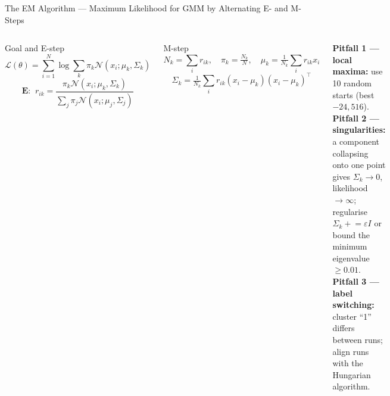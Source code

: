 \documentclass[aspectratio=169,10pt,t]{beamer}
\begin{document}
\begin{frame}{The EM Algorithm --- Maximum Likelihood for GMM by Alternating E- and M-Steps}
\begin{columns}[T]
\begin{fbx}{Goal and E-step}\[\mathcal{L}(\theta)=\sum_{i=1}^{N}\log\sum_k\pi_k\mathcal{N}(x_i;\mu_k,\Sigma_k)\]\[\textbf{E: }\ r_{ik}=\frac{\pi_k\mathcal{N}(x_i;\mu_k,\Sigma_k)}{\sum_j\pi_j\mathcal{N}(x_i;\mu_j,\Sigma_j)}\]\end{fbx}
\begin{fbx}{M-step}\[N_k=\sum_ir_{ik},\quad\pi_k=\tfrac{N_k}{N},\quad\mu_k=\tfrac1{N_k}\sum_ir_{ik}x_i\]\[\Sigma_k=\tfrac1{N_k}\sum_ir_{ik}(x_i-\mu_k)(x_i-\mu_k)^{\top}\]\end{fbx}
\begin{wbox}\scriptsize\textbf{Pitfall 1 --- local maxima:} use 10 random starts (best $-24{,}516$). \textbf{Pitfall 2 --- singularities:} a component collapsing onto one point gives $\Sigma_k\to0$, likelihood $\to\infty$; regularise $\Sigma_k\mathrel{+}=\varepsilon I$ or bound the minimum eigenvalue $\ge0.01$. \textbf{Pitfall 3 --- label switching:} cluster ``1'' differs between runs; align runs with the Hungarian algorithm.\end{wbox}
\end{columns}
\end{frame}
\end{document}
